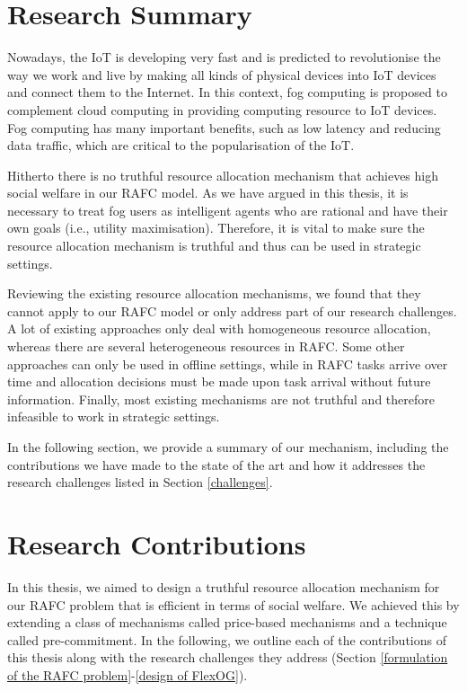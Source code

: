 \documentclass[11pt]{phdthesis}
\begin{document}
\section{Research Summary} \label{research summary}

Nowadays, the IoT is developing very fast and is predicted to revolutionise the way we work and live by making all kinds of physical devices into IoT devices and connect them to the Internet. In this context, fog computing is proposed to complement cloud computing in providing computing resource to IoT devices. Fog computing has many important benefits, such as low latency and reducing data traffic, which are critical to the popularisation of the IoT. 

Hitherto there is no truthful resource allocation mechanism that achieves high social welfare in our RAFC model. As we have argued in this thesis, it is necessary to treat fog users as intelligent agents who are rational and have their own goals (i.e., utility maximisation). Therefore, it is vital to make sure the resource allocation mechanism is truthful and thus can be used in strategic settings. 

Reviewing the existing resource allocation mechanisms, we found that they cannot apply to our RAFC model or only address part of our research challenges. A lot of existing approaches only deal with homogeneous resource allocation, whereas there are several heterogeneous resources in RAFC. Some other approaches can only be used in offline settings, while in RAFC tasks arrive over time and allocation decisions must be made upon task arrival without future information. Finally, most existing mechanisms are not truthful and therefore infeasible to work in strategic settings. 

In the following section, we provide a summary of our mechanism, including the contributions we have made to the state of the art and how it addresses the research challenges listed in Section \ref{challenges}. 

\section{Research Contributions} \label{research contributions}

In this thesis, we aimed to design a truthful resource allocation mechanism for our RAFC problem that is efficient in terms of social welfare. We achieved this by extending a class of mechanisms called price-based mechanisms and a technique called pre-commitment. In the following, we outline each of the contributions of this thesis along with the research challenges they address (Section \ref{formulation of the RAFC problem}-\ref{design of FlexOG}). 
\end{document}
